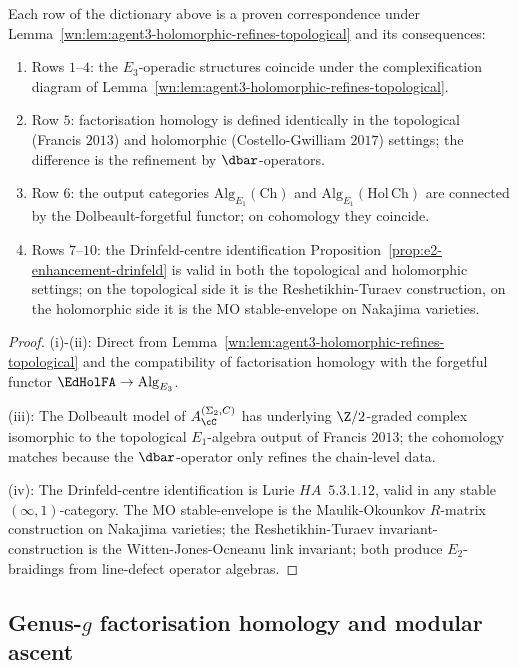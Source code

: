 \begin{proposition}
\label{wn:prop:agent3-cfg-dictionary-correct}
\ClaimStatusProvedHere
Each row of the dictionary above is a proven correspondence under Lemma~\ref{wn:lem:agent3-holomorphic-refines-topological} and its consequences:
\begin{enumerate}[label=\textup{(\roman*)}]
 \item Rows $1$--$4$: the $E_3$-operadic structures coincide under the complexification diagram of Lemma~\ref{wn:lem:agent3-holomorphic-refines-topological}.
 \item Row $5$: factorisation homology is defined identically in the topological (Francis $2013$) and holomorphic (Costello-Gwilliam $2017$) settings; the difference is the refinement by $\dbar$-operators.
 \item Row $6$: the output categories $\mathrm{Alg}_{E_1}(\mathrm{Ch})$ and $\mathrm{Alg}_{E_1}(\mathrm{Hol\,Ch})$ are connected by the Dolbeault-forgetful functor; on cohomology they coincide.
 \item Rows $7$--$10$: the Drinfeld-centre identification Proposition~\ref{prop:e2-enhancement-drinfeld} is valid in both the topological and holomorphic settings; on the topological side it is the Reshetikhin-Turaev construction, on the holomorphic side it is the MO stable-envelope on Nakajima varieties.
\end{enumerate}
\end{proposition}

\begin{proof}
(i)-(ii): Direct from Lemma~\ref{wn:lem:agent3-holomorphic-refines-topological} and the compatibility of factorisation homology with the forgetful functor $\EdHolFA\to\mathrm{Alg}_{E_3}$.

(iii): The Dolbeault model of $A^{(\Sigma_2,C)}_\cC$ has underlying $\Z/2$-graded complex isomorphic to the topological $E_1$-algebra output of Francis $2013$; the cohomology matches because the $\dbar$-operator only refines the chain-level data.

(iv): The Drinfeld-centre identification is Lurie $HA$~$5.3.1.12$, valid in any stable $(\infty,1)$-category. The MO stable-envelope is the Maulik-Okounkov $R$-matrix construction on Nakajima varieties; the Reshetikhin-Turaev invariant-construction is the Witten-Jones-Ocneanu link invariant; both produce $E_2$-braidings from line-defect operator algebras.
\end{proof}

\subsection{Genus-$g$ factorisation homology and modular ascent}
\label{wn:subsec:agent3-genus-g}

